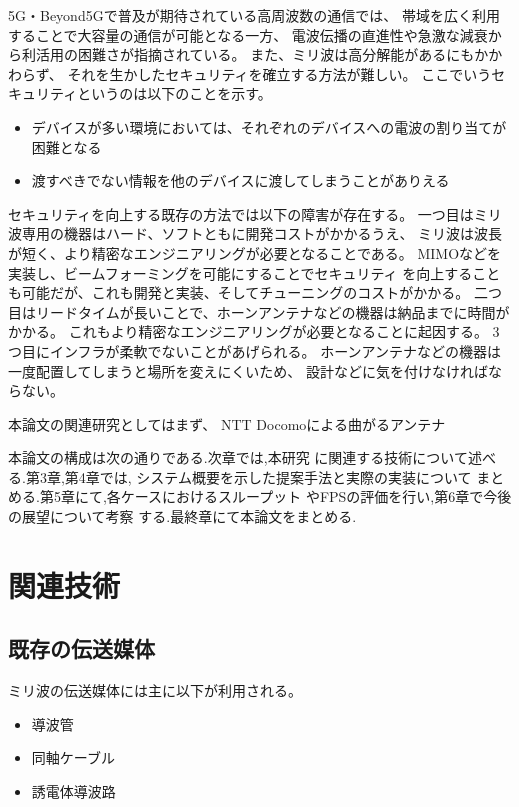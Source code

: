 \documentclass[technicalreport]{ieicej}
\begin{document}
5G・Beyond5Gで普及が期待されている高周波数の通信では、
帯域を広く利用することで大容量の通信が可能となる一方、
電波伝播の直進性や急激な減衰から利活用の困難さが指摘されている。
また、ミリ波は高分解能があるにもかかわらず、
それを生かしたセキュリティを確立する方法が難しい。
ここでいうセキュリティというのは以下のことを示す。

\begin{itemize}
  \item デバイスが多い環境においては、それぞれのデバイスへの電波の割り当てが困難となる
  \item 渡すべきでない情報を他のデバイスに渡してしまうことがありえる
\end{itemize}

セキュリティを向上する既存の方法では以下の障害が存在する。
一つ目はミリ波専用の機器はハード、ソフトともに開発コストがかかるうえ、
ミリ波は波長が短く、より精密なエンジニアリングが必要となることである。
MIMOなどを実装し、ビームフォーミングを可能にすることでセキュリティ
を向上することも可能だが、これも開発と実装、そしてチューニングのコストがかかる。
二つ目はリードタイムが長いことで、ホーンアンテナなどの機器は納品までに時間がかかる。
これもより精密なエンジニアリングが必要となることに起因する。
3つ目にインフラが柔軟でないことがあげられる。
ホーンアンテナなどの機器は一度配置してしまうと場所を変えにくいため、
設計などに気を付けなければならない。

本論文の関連研究としてはまず、
NTT Docomoによる曲がるアンテナ\cite{6840353} \cite{5723725}

本論文の構成は次の通りである.次章では,本研究
に関連する技術について述べる.第3章,第4章では,
システム概要を示した提案手法と実際の実装について
まとめる.第5章にて,各ケースにおけるスループット
やFPSの評価を行い,第6章で今後の展望について考察
する.最終章にて本論文をまとめる.

\section{関連技術}

\subsection{既存の伝送媒体}

ミリ波の伝送媒体には主に以下が利用される。
\begin{itemize}
  \item 導波管
  \item 同軸ケーブル
  \item 誘電体導波路
\end{itemize}
\end{document}
